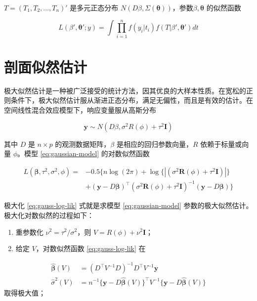 \documentclass[12pt,a4paper,UTF8,twoside]{book}
\theoremstyle{definition}
\theoremstyle{definition}
\theoremstyle{definition}
\theoremstyle{remark}
\begin{document}
\(T = (T_1,T_2,\ldots,T_n)'\) 是多元正态分布
\(N(D\beta,\Sigma(\boldsymbol{\theta}))\)，参数\(\beta,\boldsymbol{\theta}\)
的似然函数

\begin{equation}
L(\beta',\boldsymbol{\theta}';y) = \int \prod_{i=1}^{n}f(y_i|t_i)f(T|\beta',\boldsymbol{\theta}')dt \label{eq:likelihood-function}
\end{equation}

\hypertarget{profile-likelihood}{%
\section{剖面似然估计}\label{profile-likelihood}}

极大似然估计是一种被广泛接受的统计方法，因其优良的大样本性质。在宽松的正则条件下，极大似然估计服从渐进正态分布，满足无偏性，而且是有效的估计。在空间线性混合效应模型下，响应变量服从高斯分布

\begin{equation}
\mathbf{y} \sim N(D\beta,\sigma^2 R(\phi) + \tau^2\mathbf{I})
\label{eq:gaussian-model}
\end{equation}

其中 \(D\) 是 \(n \times p\) 的观测数据矩阵，\(\beta\)
是相应的回归参数向量，\(R\) 依赖于标量或向量 \(\phi\)。模型
\eqref{eq:gaussian-model} 的对数似然函数

\begin{equation}
\begin{aligned}
L(\boldsymbol{\beta},\tau^2,\sigma^2,\phi) = {} 
 & - 0.5\{ n\log(2\pi) + \log\{|(\sigma^2\mathbf{R}(\phi)+\tau^2\mathbf{I})|\} \\
 & + (\mathbf{y} - D\boldsymbol{\beta})^{\top}(\sigma^2\mathbf{R}(\phi)+\tau^2\mathbf{I})^{-1}(\mathbf{y} - D\boldsymbol{\beta}) \}  
\end{aligned} \label{eq:gauss-log-lik}
\end{equation}

极大化 \eqref{eq:gauss-log-lik} 式就是求模型 \eqref{eq:gaussian-model}
参数的极大似然估计。极大化对数似然的过程如下：

\begin{enumerate}
\def\labelenumi{\arabic{enumi}.}
\item
  重参数化 \(\nu^2 = \tau^2/\sigma^2\)，则
  \(V = R(\phi) + \nu^2 \mathbf{I}\)；
\item
  给定 \(V\)，对数似然函数 \eqref{eq:gauss-log-lik} 在
\end{enumerate}

\begin{equation}
  \begin{aligned}
  \hat{\boldsymbol{\beta}}(V) & =  (D^{\top} V^{-1} D)^{-1} D^{\top} V^{-1}\mathbf{y} \\
  \hat{\sigma}^2(V)           & =  n^{-1} \{\mathbf{y} - D\hat{\boldsymbol{\beta}}(V)\}^{\top} V^{-1} \{\mathbf{y} - D\hat{\boldsymbol{\beta}}(V)\}
  \end{aligned} \label{eq:beta-sigma}
  \end{equation} 取得极大值；
\end{document}
